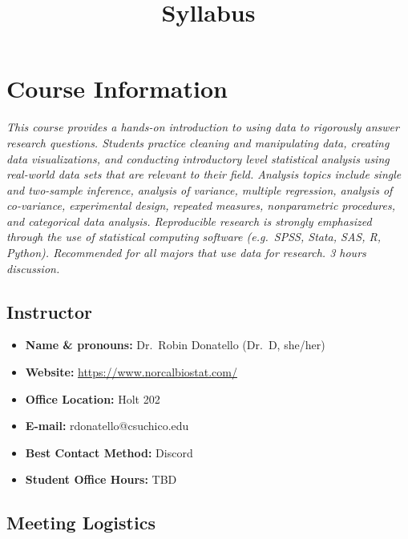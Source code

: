 \documentclass[
  letterpaper,
  DIV=11,
  numbers=noendperiod]{scrartcl}
\title{Syllabus}
\author{}
\date{}
\providecommand{\tightlist}{%
  \setlength{\itemsep}{0pt}\setlength{\parskip}{0pt}}\usepackage{longtable,booktabs,array}
\begin{document}
\maketitle
\ifdefined\Shaded\renewenvironment{Shaded}{\begin{tcolorbox}[enhanced, frame hidden, interior hidden, boxrule=0pt, breakable, borderline west={3pt}{0pt}{shadecolor}, sharp corners]}{\end{tcolorbox}}\fi

\hypertarget{course-information}{%
\section{Course Information}\label{course-information}}

\emph{This course provides a hands-on introduction to using data to
rigorously answer research questions. Students practice cleaning and
manipulating data, creating data visualizations, and conducting
introductory level statistical analysis using real-world data sets that
are relevant to their field. Analysis topics include single and
two-sample inference, analysis of variance, multiple regression,
analysis of co-variance, experimental design, repeated measures,
nonparametric procedures, and categorical data analysis. Reproducible
research is strongly emphasized through the use of statistical computing
software (e.g.~SPSS, Stata, SAS, R, Python). Recommended for all majors
that use data for research. 3 hours discussion.}

\hypertarget{instructor}{%
\subsection{Instructor}\label{instructor}}

\begin{itemize}
\tightlist
\item
  \textbf{Name \& pronouns:} Dr.~Robin Donatello (Dr.~D, she/her)
\item
  \textbf{Website:} \url{https://www.norcalbiostat.com/}
\item
  \textbf{Office Location:} Holt 202
\item
  \textbf{E-mail:} rdonatello@csuchico.edu
\item
  \textbf{Best Contact Method:} Discord
\item
  \textbf{Student Office Hours:} TBD
\end{itemize}

\hypertarget{meeting-logistics}{%
\subsection{Meeting Logistics}\label{meeting-logistics}}
\end{document}
